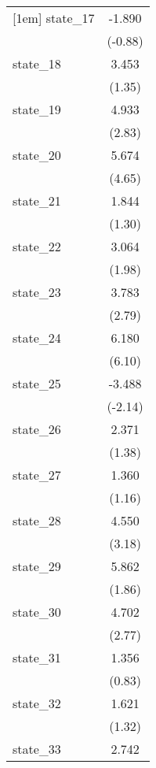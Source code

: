 {\begin{tabular}{l*{1}{c}}
[1em]
state\_17    &      -1.890         \\
            &     (-0.88)         \\
[1em]
state\_18    &       3.453         \\
            &      (1.35)         \\
[1em]
state\_19    &       4.933\sym{**} \\
            &      (2.83)         \\
[1em]
state\_20    &       5.674\sym{***}\\
            &      (4.65)         \\
[1em]
state\_21    &       1.844         \\
            &      (1.30)         \\
[1em]
state\_22    &       3.064\sym{*}  \\
            &      (1.98)         \\
[1em]
state\_23    &       3.783\sym{**} \\
            &      (2.79)         \\
[1em]
state\_24    &       6.180\sym{***}\\
            &      (6.10)         \\
[1em]
state\_25    &      -3.488\sym{*}  \\
            &     (-2.14)         \\
[1em]
state\_26    &       2.371         \\
            &      (1.38)         \\
[1em]
state\_27    &       1.360         \\
            &      (1.16)         \\
[1em]
state\_28    &       4.550\sym{**} \\
            &      (3.18)         \\
[1em]
state\_29    &       5.862         \\
            &      (1.86)         \\
[1em]
state\_30    &       4.702\sym{**} \\
            &      (2.77)         \\
[1em]
state\_31    &       1.356         \\
            &      (0.83)         \\
[1em]
state\_32    &       1.621         \\
            &      (1.32)         \\
[1em]
state\_33    &       2.742\sym{*}  \\

\end{tabular}}

